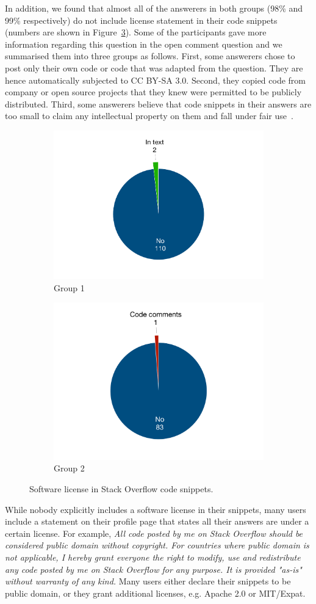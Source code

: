 \documentclass{svjour3}                     %
\begin{document}
In addition, we found that almost all of the answerers in both groups (98\% and
99\% respectively) do not include license statement in their code snippets
(numbers are shown in Figure~\ref{fig:survey_license}). Some of the participants
gave more information regarding this question in the open comment question and
we summarised them into three groups as follows. First, some answerers chose to post only their
own code or code that was adapted from the question. They are hence
automatically subjected to CC BY-SA 3.0. Second, they copied code from company
or open source projects that they knew were permitted to be publicly
distributed. Third, some answerers believe that code snippets in their answers
are too small to claim any intellectual property on them and fall under fair
use~\citep{fairuse}.

\begin{figure}
	\begin{subfigure}{.5\textwidth}
		\centering
		\includegraphics[width=.4\linewidth]{survey_license_1}
		\caption{Group 1}
		\label{fig:survey_license_1}
	\end{subfigure}%
	\begin{subfigure}{.5\textwidth}
		\centering
		\includegraphics[width=.4\linewidth]{survey_license_2}
		\caption{Group 2}
		\label{fig:survey_license_2}
	\end{subfigure}
	\caption{Software license in Stack Overflow code snippets.}
	\label{fig:survey_license}
\end{figure}

While nobody explicitly includes a software license in their snippets,
many users include a statement on their profile page that states all their
answers are under a certain license. For example, \textit{All code posted by me on
	Stack Overflow should be considered public domain without copyright. For
	countries where public domain is not applicable, I hereby grant everyone the
	right to modify, use and redistribute any code posted by me on Stack Overflow
	for any purpose. It is provided "as-is" without warranty of any kind.}  Many
users either declare their snippets to be public domain, or they grant
additional licenses, e.g. Apache 2.0 or MIT/Expat.
\end{document}
